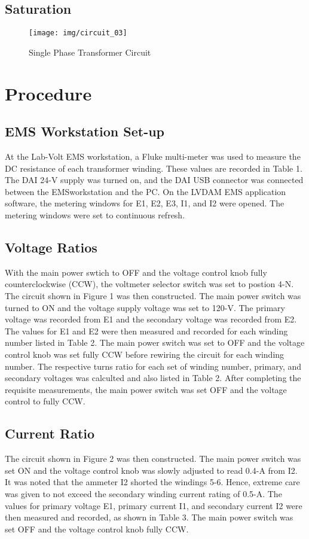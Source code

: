 \documentclass{article}
\begin{document}
\subsection{Saturation}
\begin{figure}[H]
  \centering
  \texttt{[image: img/circuit\_03]}
  \caption{Single Phase Transformer Circuit}
  \label{fig:circuit_03}
\end{figure}

\section{Procedure}
\subsection{EMS Workstation Set-up}
At the Lab-Volt EMS workstation, a Fluke multi-meter was used to measure the DC resistance of each transformer
winding. These values are recorded in Table 1. The DAI 24-V supply was turned on, and the DAI USB connector was 
connected between the EMSworkstation and the PC. On the LVDAM EMS application software, the metering windows 
for E1, E2, E3, I1, and I2 were opened. The metering windows were set to continuous refresh. 

\subsection{Voltage Ratios}
\label{part1}
With the main power swtich to OFF and the voltage control knob fully counterclockwise (CCW), the voltmeter selector 
switch was set to postion 4-N. The circuit shown in Figure 1 was then constructed. The main power switch was
turned to ON and the voltage supply voltage was set to 120-V. The primary voltage was recorded from E1 and the 
secondary voltage was recorded from E2. The values for E1 and E2 were then measured and recorded for each winding
number listed in Table 2. The main power switch was set to OFF and the voltage control knob was set fully CCW
before rewiring the circuit for each winding number. The respective turns ratio for each set of winding 
number, primary, and secondary voltages was calculted and also listed in Table 2. After completing the requisite
measurements, the main power switch was set OFF and the voltage control to fully CCW.

\subsection{Current Ratio}
\label{part2}
The circuit shown in Figure 2 was then constructed. The main power switch was set ON and the voltage control knob
was slowly adjusted to read 0.4-A from I2. It was noted that the ammeter I2 shorted the windings 5-6. Hence,
extreme care was given to not exceed the secondary winding current rating of 0.5-A. The values for primary voltage
E1, primary current I1, and secondary current I2 were then measured and recorded, as shown in Table 3. The main 
power switch was set OFF and the voltage control knob fully CCW.
\end{document}
